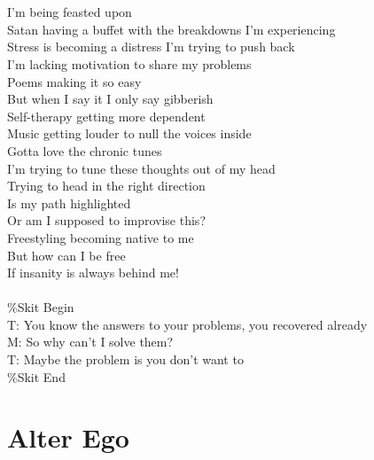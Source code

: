 \documentclass[12pt, b5paper, oneside]{book}
\begin{document}
%
\\\\I'm being feasted upon 
\\Satan having a buffet with the breakdowns I'm experiencing 
\\Stress is becoming a distress I'm trying to push back
\\I'm lacking motivation to share my problems
\\Poems making it so easy
\\But when I say it I only say gibberish
\\Self-therapy getting more dependent
\\Music getting louder to null the voices inside
\\Gotta love the chronic tunes
\\I'm trying to tune these thoughts out of my head
\\Trying to head in the right direction
\\Is my path highlighted
\\Or am I supposed to improvise this?
\\Freestyling becoming native to me
\\But how can I be free
\\If insanity is always behind me!
%
\\\\\%Skit Begin
\\T: You know the answers to your problems, you recovered already
\\M: So why can't I solve them?
\\T: Maybe the problem is you don't want to
\\\%Skit End 

\chapter{Alter Ego}
\end{document}
